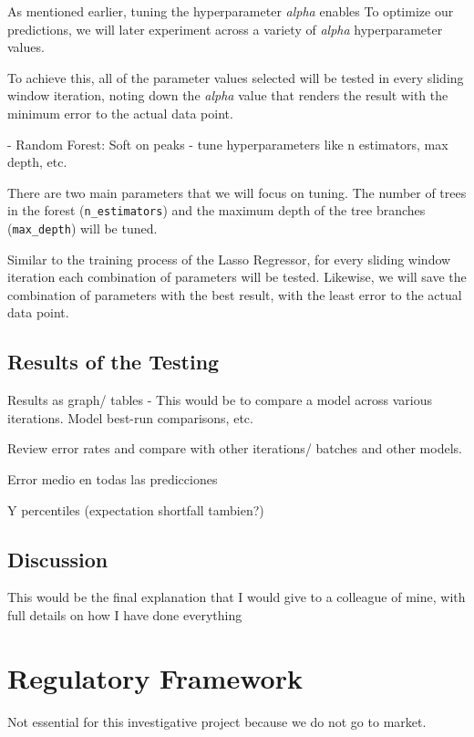 \documentclass[12pt]{report} %
\begin{document}
As mentioned earlier, tuning the hyperparameter \textit{alpha} enables To optimize our predictions, we will later experiment across a variety of \textit{alpha} hyperparameter values.

To achieve this, all of the parameter values selected will be tested in every sliding window iteration, noting down the \textit{alpha} value that renders the result with the minimum error to the actual data point.


- Random Forest: Soft on peaks - tune hyperparameters like n estimators, max depth, etc.

There are two main parameters that we will focus on tuning. The number of trees in the forest (\small{\verb|n_estimators|}) and the maximum depth of the tree branches (\small{\verb|max_depth|}) will be tuned.

Similar to the training process of the Lasso Regressor, for every sliding window iteration each combination of parameters will be tested. Likewise, we will save the combination of parameters with the best result, with the least error to the actual data point.


\section{Results of the Testing}
Results as graph/ tables - This would be to compare a model across various iterations. Model best-run comparisons, etc.

Review error rates and compare with other iterations/ batches and other models.

Error medio en todas las predicciones

Y percentiles (expectation shortfall tambien?)


\section{Discussion} %
This would be the final explanation that I would give to a colleague of mine, with full details on how I have done everything



\chapter{Regulatory Framework}
Not essential for this investigative project because we do not go to market.
\end{document}
